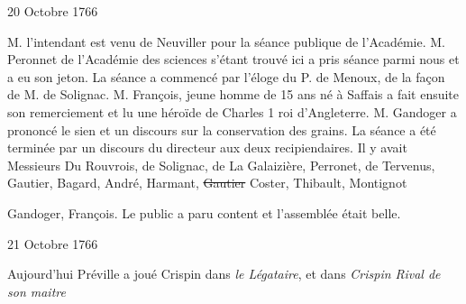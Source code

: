                      \begin{diary}{20 Octobre 1766}{}
                        
                        
                           M. l’intendant est venu de
                              Neuviller pour
                           la séance publique de l’Académie.
                              M.
                              Peronnet de l’Académie des sciences s’étant trouvé ici
                           a pris séance parmi nous et a eu son
                           jeton. La séance a commencé par
                           l’éloge du P. de Menoux, de la
                           façon de M.
                              de Solignac. M.
                              François, jeune homme
                           de 15 ans né à Saffais a fait
                           ensuite
                           son remerciement et lu une héroïde
                              de
                              Charles 1 roi
                              d’Angleterre. M.
                              Gandoger
                           a prononcé le sien et un discours sur
                              la
                              conservation des grains. La séance a
                           été terminée par un discours du directeur
                           aux deux recipiendaires. Il y avait Messieurs
                           Du Rouvrois, de Solignac, de
                              La Galaizière,
                           Perronet, de Tervenus, Gautier, Bagard,
                           André, Harmant, \sout{Gautier}
                           Coster, Thibault,
                           Montignot
                           
                           Gandoger, François. Le public a paru
                           content et l’assemblée était belle. \bigskip
        
        
                     \end{diary}
                     
                     \begin{diary}{21 Octobre 1766}{}
                        
                         Aujourd'hui Préville a joué Crispin dans
                           \emph{le Légataire}, et dans \emph{Crispin Rival
                              de son maitre}
                        \bigskip
        
        
                     \end{diary}

